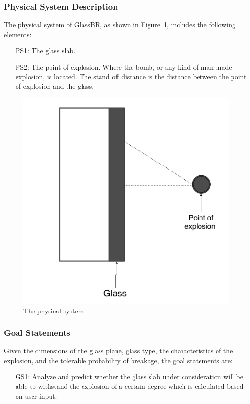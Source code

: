 \documentclass[12pt]{article}
\begin{document}
\subsubsection{Physical System Description}
\label{Sec:PhysSyst}
The physical system of GlassBR, as shown in Figure~\ref{Figure:physSystImage}, includes the following elements:
\begin{itemize}
\item[PS1:]The glass slab.
\item[PS2:]The point of explosion. Where the bomb, or any kind of man-made explosion, is located. The stand off distance is the distance between the point of explosion and the glass.
\end{itemize}
\begin{figure}
\begin{center}
\includegraphics[width=\textwidth]{../../../datafiles/GlassBR/physicalsystimage.png}
\caption{The physical system}
\label{Figure:physSystImage}
\end{center}
\end{figure}
\subsubsection{Goal Statements}
\label{Sec:GoalStmt}
Given the dimensions of the glass plane, glass type, the characteristics of the explosion, and the tolerable probability of breakage, the goal statements are:
\begin{itemize}
\item[GS1:]Analyze and predict whether the glass slab under consideration will be able to withstand the explosion of a certain degree which is calculated based on user input.
\end{itemize}
\end{document}
